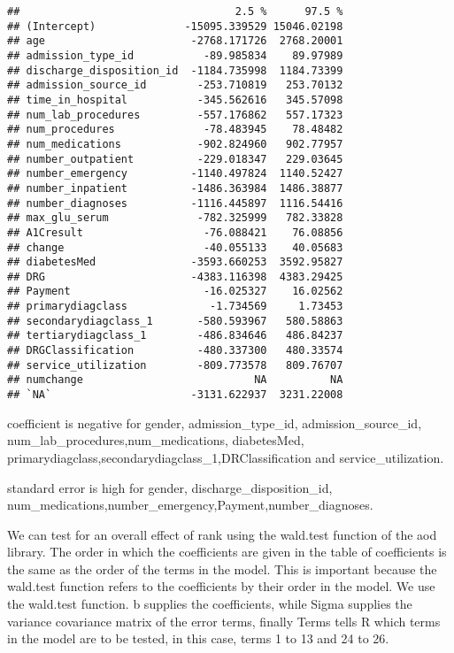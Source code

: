 \documentclass[11pt,]{article}
\begin{document}
\begin{verbatim}
##                                  2.5 %      97.5 %
## (Intercept)              -15095.339529 15046.02198
## age                       -2768.171726  2768.20001
## admission_type_id           -89.985834    89.97989
## discharge_disposition_id  -1184.735998  1184.73399
## admission_source_id        -253.710819   253.70132
## time_in_hospital           -345.562616   345.57098
## num_lab_procedures         -557.176862   557.17323
## num_procedures              -78.483945    78.48482
## num_medications            -902.824960   902.77957
## number_outpatient          -229.018347   229.03645
## number_emergency          -1140.497824  1140.52427
## number_inpatient          -1486.363984  1486.38877
## number_diagnoses          -1116.445897  1116.54416
## max_glu_serum              -782.325999   782.33828
## A1Cresult                   -76.088421    76.08856
## change                      -40.055133    40.05683
## diabetesMed               -3593.660253  3592.95827
## DRG                       -4383.116398  4383.29425
## Payment                     -16.025327    16.02562
## primarydiagclass             -1.734569     1.73453
## secondarydiagclass_1       -580.593967   580.58863
## tertiarydiagclass_1        -486.834646   486.84237
## DRGClassification          -480.337300   480.33574
## service_utilization        -809.773578   809.76707
## numchange                           NA          NA
## `NA`                      -3131.622937  3231.22008
\end{verbatim}

coefficient is negative for gender, admission\_type\_id,
admission\_source\_id, num\_lab\_procedures,num\_medications,
diabetesMed, primarydiagclass,secondarydiagclass\_1,DRClassification and
service\_utilization.

standard error is high for gender, discharge\_disposition\_id,
num\_medications,number\_emergency,Payment,number\_diagnoses.

We can test for an overall effect of rank using the wald.test function
of the aod library. The order in which the coefficients are given in the
table of coefficients is the same as the order of the terms in the
model. This is important because the wald.test function refers to the
coefficients by their order in the model. We use the wald.test function.
b supplies the coefficients, while Sigma supplies the variance
covariance matrix of the error terms, finally Terms tells R which terms
in the model are to be tested, in this case, terms 1 to 13 and 24 to 26.
\end{document}
